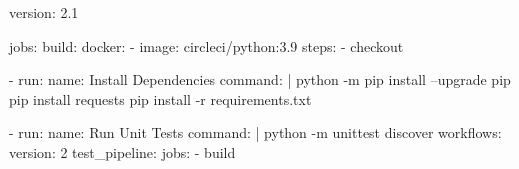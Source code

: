version: 2.1

jobs:
  build:
    docker:
      - image: circleci/python:3.9
    steps:
      - checkout

      - run:
          name: Install Dependencies
          command: |
            python -m pip install --upgrade pip
            pip install requests
            pip install -r requirements.txt

      - run:
          name: Run Unit Tests
          command: |
            python -m unittest discover
workflows:
  version: 2
  test_pipeline:
    jobs:
      - build



